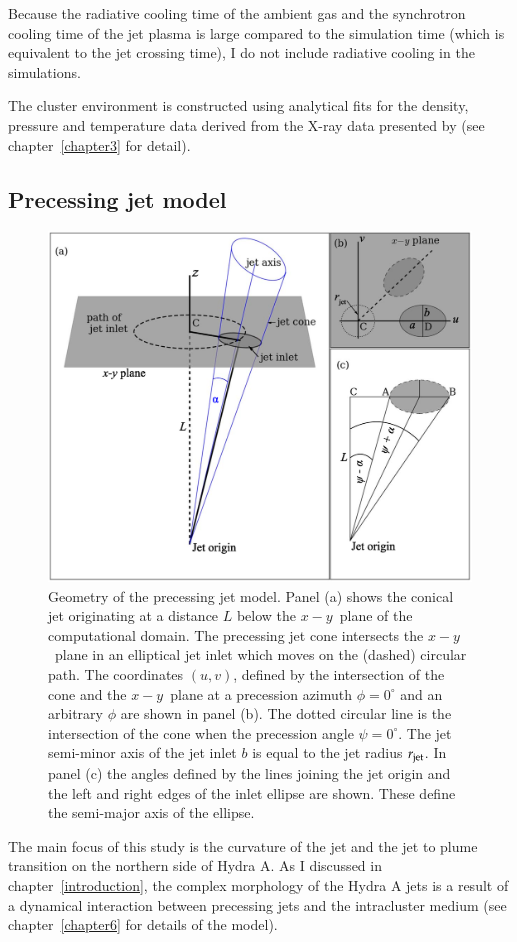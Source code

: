 Because the radiative cooling time of the ambient gas and the synchrotron cooling time of the jet plasma is large compared to the simulation time (which is equivalent to the jet crossing time), I do not include radiative cooling in the simulations.

The cluster environment is constructed using analytical fits for the density, pressure and temperature data derived from the X-ray data presented by \citet{david01} (see chapter~\ref{chapter3} for detail).

\subsection{Precessing jet model}
\begin{figure}
\centering
\includegraphics[width=\linewidth]{fig2.eps}
\caption{Geometry of the precessing jet model. Panel (a) shows  the conical jet originating at a distance $L$ below the $x-y$~plane of the computational domain. The precessing jet cone intersects the $x-y$~plane in an elliptical jet inlet which moves on the (dashed) circular path. The coordinates $(u,v)$, defined by the intersection of the cone and the $x-y$~plane at a precession azimuth $\phi = 0^{\circ}$ and an arbitrary $\phi$ are shown in panel (b). The dotted circular line is the intersection of the cone when the precession angle $\psi = 0^{\circ}$.
The jet semi-minor axis of the jet inlet $b$ is equal to the jet radius $r_{\rm jet}$.  In panel (c) the angles defined by the lines joining the jet origin and the left and right edges of the inlet ellipse are shown. These define the semi-major axis of the ellipse.}
\label{f:mod}
\end{figure}
The main focus of this study is the curvature of the jet and the jet to plume transition on the northern side of Hydra A. As I discussed in chapter~\ref{introduction}, the complex morphology of the Hydra A jets is a result of a dynamical interaction between precessing jets and the intracluster medium (see chapter~\ref{chapter6} for details of the model).

